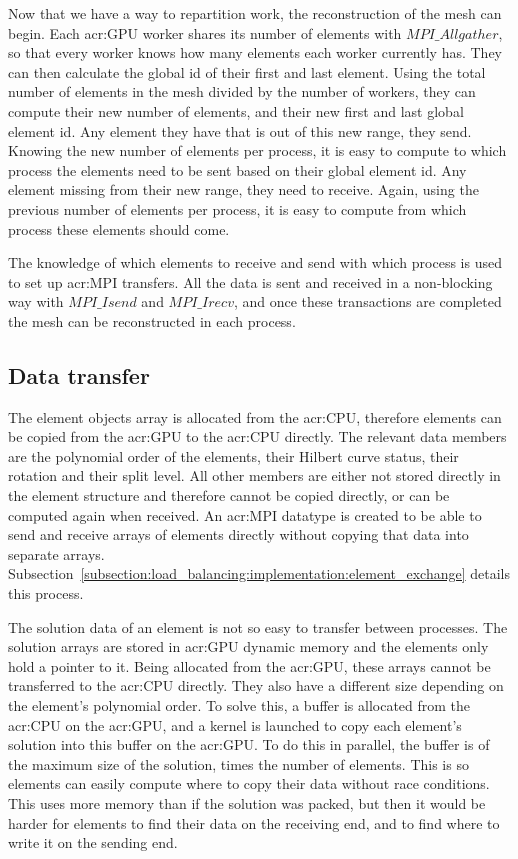 Now that we have a way to repartition work, the reconstruction of the mesh can begin. Each
\acrshort{acr:GPU} worker shares its number of elements with \(MPI\_Allgather\), so that every worker
knows how many elements each worker currently has. They can then calculate the global id of their
first and last element. Using the total number of elements in the mesh divided by the number of
workers, they can compute their new number of elements, and their new first and last global element
id. Any element they have that is out of this new range, they send. Knowing the new number of
elements per process, it is easy to compute to which process the elements need to be sent based on
their global element id. Any element missing from their new range, they need to receive. Again,
using the previous number of elements per process, it is easy to compute from which process these
elements should come. 

The knowledge of which elements to receive and send with which process is used to set up
\acrshort{acr:MPI} transfers. All the data is sent and received in a non-blocking way with
\(MPI\_Isend\) and \(MPI\_Irecv\), and once these transactions are completed the mesh can be
reconstructed in each process.

\subsection{Data transfer}\label{subsection:load_balancing:reconstruction:data_transfer}

The element objects array is allocated from the \acrshort{acr:CPU}, therefore elements can be copied
from the \acrshort{acr:GPU} to the \acrshort{acr:CPU} directly. The relevant data members are the
polynomial order of the elements, their Hilbert curve status, their rotation and their split level.
All other members are either not stored directly in the element structure and therefore cannot be
copied directly, or can be computed again when received. An \acrshort{acr:MPI} datatype is created
to be able to send and receive arrays of elements directly without copying that data into separate
arrays. Subsection~\ref{subsection:load_balancing:implementation:element_exchange} details this
process.

The solution data of an element is not so easy to transfer between processes. The solution arrays
are stored in \acrshort{acr:GPU} dynamic memory and the elements only hold a pointer to it. Being
allocated from the \acrshort{acr:GPU}, these arrays cannot be transferred to the \acrshort{acr:CPU}
directly. They also have a different size depending on the element's polynomial order. To solve
this, a buffer is allocated from the \acrshort{acr:CPU} on the \acrshort{acr:GPU}, and a kernel is
launched to copy each element's solution into this buffer on the \acrshort{acr:GPU}. To do this in
parallel, the buffer is of the maximum size of the solution, times the number of elements. This is
so elements can easily compute where to copy their data without race conditions. This uses more
memory than if the solution was packed, but then it would be harder for elements to find their data
on the receiving end, and to find where to write it on the sending end. 

